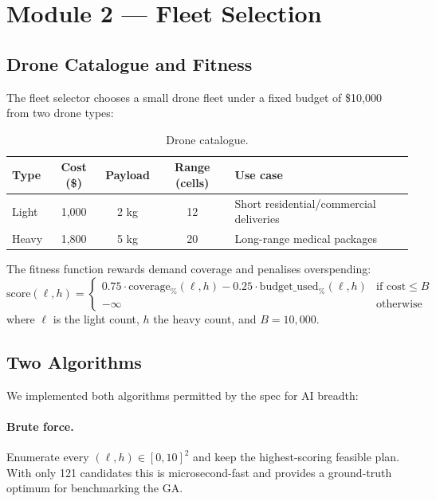 \documentclass[11pt,a4paper]{article}
\begin{document}
\section{Module 2 --- Fleet Selection}
\label{sec:fleet}

\subsection{Drone Catalogue and Fitness}
The fleet selector chooses a small drone fleet under a fixed budget of
\$10{,}000 from two drone types:

\begin{table}[H]
\centering
\caption{Drone catalogue.}
\begin{tabular}{@{}lcccp{4cm}@{}}
\toprule
\textbf{Type} & \textbf{Cost (\$)} & \textbf{Payload} & \textbf{Range (cells)} & \textbf{Use case} \\
\midrule
Light & 1{,}000 & 2 kg & 12 & Short residential/commercial deliveries \\
Heavy & 1{,}800 & 5 kg & 20 & Long-range medical packages \\
\bottomrule
\end{tabular}
\end{table}

The fitness function rewards demand coverage and penalises overspending:
\begin{equation}
\text{score}(\ell, h) =
\begin{cases}
0.75 \cdot \text{coverage}_{\%}(\ell, h) - 0.25 \cdot \text{budget\_used}_{\%}(\ell, h) & \text{if cost} \leq B \\
-\infty & \text{otherwise}
\end{cases}
\label{eq:fitness}
\end{equation}
where $\ell$ is the light count, $h$ the heavy count, and $B = 10{,}000$.

\subsection{Two Algorithms}
We implemented both algorithms permitted by the spec for AI breadth:

\paragraph{Brute force.} Enumerate every $(\ell, h) \in [0, 10]^2$ and
keep the highest-scoring feasible plan. With only 121 candidates this is
microsecond-fast and provides a ground-truth optimum for benchmarking
the GA.
\end{document}

